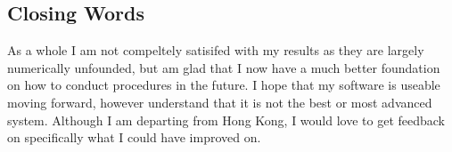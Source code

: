 \documentclass{article}
\begin{document}
\begin{multicols}{2}
\section{Closing Words}

As a whole I am not compeltely satisifed with my results as they are largely 
numerically unfounded, but am glad that I now 
have a much better foundation on how to conduct procedures in the future. I hope that my 
software is useable moving forward, however understand that it is not the best or 
most advanced system. Although I am departing from Hong Kong, I would love to get feedback
on specifically what I could have improved on.

\end{multicols}
\end{document}
